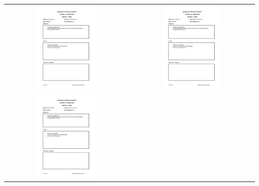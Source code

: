\documentclass[12pt,a4paper]{article}
\begin{document}
\begin{appendices}
\begin{longtable}{@{}cc@{}}
\includegraphics[page=13, width=0.5\textwidth]{figures/diaries} &
\includegraphics[page=14, width=0.5\textwidth]{figures/diaries} \\
\includegraphics[page=15, width=0.5\textwidth]{figures/diaries} &
\end{longtable}



\end{appendices}
\end{document}
